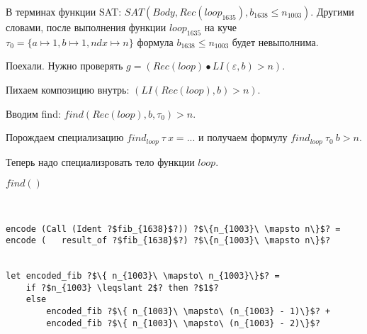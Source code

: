 \documentclass[a5paper,12pt]{article}
\begin{document}
В терминах функции SAT: $SAT(Body, Rec(loop_{1635}), b_{1638} \leqslant n_{1003})$. Другими словами, после выполнения функции $loop_{1635}$ на куче $\tau_0=\{a\mapsto 1, b\mapsto 1, ndx\mapsto n\}$ формула $b_{1638} \leqslant n_{1003}$ будет невыполнима.

Поехали. Нужно проверять $g = (Rec(loop)\bullet LI(\varepsilon, b) > n)$.

Пихаем композицию внутрь:  $(LI(Rec(loop), b) > n)$.

Вводим find: $find(Rec(loop), b, \tau_0) > n$.

Порождаем специализацию $find_{loop}\ \tau\ x = ...$ и получаем формулу $find_{loop}\  \tau_0\ b > n$.

Теперь надо специализровать тело функции $loop$. 
\begin{center}
	$find()$
\end{center}



\begin{verbatim}


encode (Call (Ident ?$fib_{1638}$?)) ?$\{n_{1003}\ \mapsto n\}$? = 
encode (   result_of ?$fib_{1638}$?) ?$\{n_{1003}\ \mapsto n\}$?


let encoded_fib ?$\{ n_{1003}\ \mapsto\ n_{1003}\}$? = 
    if ?$n_{1003} \leqslant 2$? then ?$1$?
    else 
        encoded_fib ?$\{ n_{1003}\ \mapsto\ (n_{1003} - 1)\}$? +  
        encoded_fib ?$\{ n_{1003}\ \mapsto\ (n_{1003} - 2)\}$?
\end{verbatim}
\end{document}
